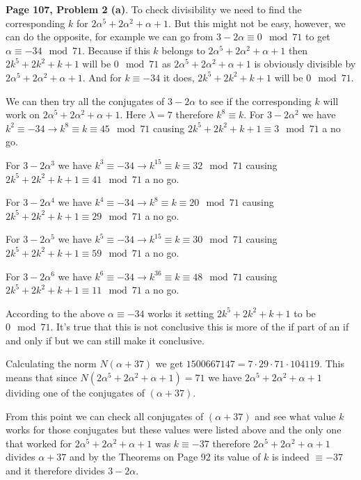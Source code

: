 \documentclass[aps,preprint,preprintnumbers,nofootinbib,showpacs,prd]{revtex4-1}
\begin{document}
{\bf Page 107, Problem 2 (a)}. To check divisibility we need to find the corresponding $k$ for $2\alpha^5 + 2\alpha^2 + \alpha + 1$. But this might not be easy, however, we can do the opposite, for example we can go from $3 - 2\alpha \equiv 0 \mod{71}$ to get $\alpha \equiv -34 \mod{71}$. Because if this $k$ belongs to $2\alpha^5 + 2\alpha^2 + \alpha + 1$ then $2k^5 + 2k^2 + k + 1$ will be $0 \mod{71}$ as $2\alpha^5 + 2\alpha^2 + \alpha + 1$ is obviously divisible by $2\alpha^5 + 2\alpha^2 + \alpha + 1$. And for $k \equiv -34$ it does, $2k^5 + 2k^2 + k + 1$ will be $0 \mod{71}$.

We can then try all the conjugates of $3 - 2\alpha$ to see if the corresponding $k$ will work on $2\alpha^5 + 2\alpha^2 + \alpha + 1$. Here $\lambda = 7$ therefore $k^8 \equiv k$. For $3 - 2\alpha^2$ we have $k^2 \equiv -34 \to k^8 \equiv k \equiv 45 \mod{71}$ causing $2k^5 + 2k^2 + k + 1 \equiv 3 \mod{71}$ a no go.

For $3 - 2\alpha^3$ we have $k^3 \equiv -34 \to k^{15} \equiv k \equiv 32 \mod{71}$ causing $2k^5 + 2k^2 + k + 1 \equiv 41 \mod{71}$ a no go.

For $3 - 2\alpha^4$ we have $k^4 \equiv -34 \to k^{8} \equiv k \equiv 20 \mod{71}$ causing $2k^5 + 2k^2 + k + 1 \equiv 29 \mod{71}$ a no go.

For $3 - 2\alpha^5$ we have $k^5 \equiv -34 \to k^{15} \equiv k \equiv 30 \mod{71}$ causing $2k^5 + 2k^2 + k + 1 \equiv 59 \mod{71}$ a no go.

For $3 - 2\alpha^6$ we have $k^6 \equiv -34 \to k^{36} \equiv k \equiv 48 \mod{71}$ causing $2k^5 + 2k^2 + k + 1 \equiv 11 \mod{71}$ a no go.

According to the above $\alpha \equiv -34$ works it setting $2k^5 + 2k^2 + k + 1$ to be $0 \mod{71}$. It's true that this is not conclusive this is more of the if part of an if and only if but we can still make it conclusive. 

Calculating the norm $N(\alpha + 37)$ we get $1500667147 = 7 \cdot 29 \cdot 71 \cdot 104119$. This means that since $N(2\alpha^5 + 2\alpha^2 + \alpha + 1) = 71$ we have $2\alpha^5 + 2\alpha^2 + \alpha + 1$ dividing one of the conjugates of $(\alpha + 37)$.

From this point we can check all conjugates of $(\alpha + 37)$ and see what value $k$ works for those conjugates but these values were listed above and the only one that worked for $2\alpha^5 + 2\alpha^2 + \alpha + 1$ was $k \equiv -37$ therefore $2\alpha^5 + 2\alpha^2 + \alpha + 1$ divides $\alpha + 37$ and by the Theorems on Page 92 its value of $k$ is indeed $\equiv -37$ and it therefore divides $3 - 2\alpha$.
\end{document}
